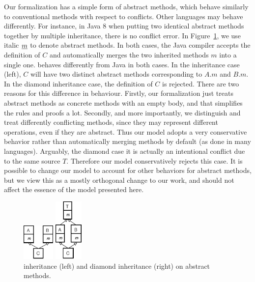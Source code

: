 Our formalization has a simple form of abstract methods, which behave similarly to conventional methods with respect to conflicts.
Other languages may behave differently. 
For instance, in Java 8 when putting two identical abstract methods together by multiple inheritance, there is no conflict error. In Figure~\ref{fig:abstractdiamond}, we use italic $\emph{m}$ to denote abstract methods. In both cases, the Java compiler accepts the definition of $C$ and automatically merges the two inherited methods $m$ into a single one. \MIM{} behaves differently from Java in both cases.
In the \wordfork{} inheritance case (left), $C$ will have two distinct abstract methods corresponding to $A.m$ and $B.m$. 
In the diamond inheritance case, the definition of $C$ is rejected. 
There are two reasons for this difference in behaviour. Firstly, our formalization just treats abstract methods as concrete methods with an empty body, and that simplifies
the rules and proofs a lot. Secondly, and more importantly, we distinguish and treat differently conflicting methods, since they may represent different operations, even if they are abstract. Thus our model adopts a very conservative behavior rather than automatically merging 
methods by default (as done in many languages). 
Arguably, the diamond case it is actually an intentional conflict due
to the same source $T$. Therefore our model conservatively rejects
this case.
It is possible to change our model to account for other behaviors for abstract methods, but we view this as a mostly 
orthogonal change to our work, and should not affect the essence of the model presented here.

\begin{figure}[t]
\saveSpaceFig
    \centering
    \begin{minipage}[t]{0.45\textwidth}
        \centering
        \includegraphics[width=1.6cm]{pics/P7.pdf}
    \end{minipage}
    \centering
    \hspace*{2pt}
    \begin{minipage}[t]{0.45\textwidth}
        \centering
        \includegraphics[width=1.4cm]{pics/P8.pdf}
    \end{minipage}  
    \caption{\wordFork{} inheritance (left) and diamond inheritance (right) on abstract methods.}\label{fig:abstractdiamond}
\saveSpaceFig
\end{figure}

